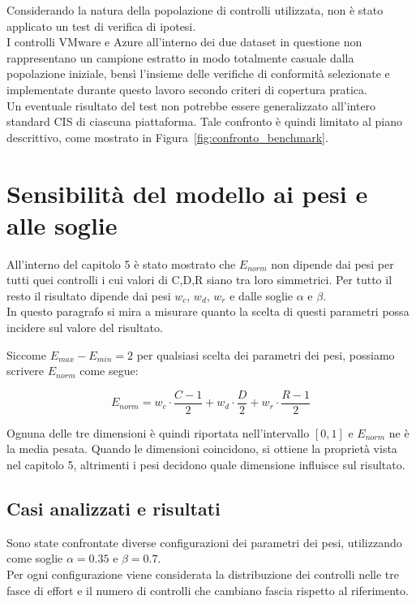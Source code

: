 \documentclass[a4paper,11pt]{report}
\begin{document}
Considerando la natura della popolazione di controlli utilizzata, non è stato applicato un test di verifica di ipotesi.\\
I controlli VMware e Azure all'interno dei due dataset in questione non rappresentano un campione estratto in modo totalmente casuale dalla popolazione iniziale, bensì l'insieme delle verifiche di conformità selezionate e implementate durante questo lavoro secondo criteri di copertura pratica. \\
Un eventuale risultato del test non potrebbe essere generalizzato all'intero standard CIS di ciascuna piattaforma. Tale confronto è quindi limitato al piano descrittivo, come mostrato in Figura~\ref{fig:confronto_benchmark}.


\section{Sensibilità del modello ai pesi e alle soglie}

All'interno del capitolo 5 è stato mostrato che $E_{norm}$ non dipende dai pesi per tutti quei controlli i cui valori di C,D,R siano tra loro simmetrici. Per tutto il resto il risultato dipende dai pesi $w_c$, $w_d$, $w_r$ e dalle soglie $\alpha$ e $\beta$.\\
In questo paragrafo si mira a misurare quanto la scelta di questi parametri possa incidere sul valore del risultato.

Siccome $E_{max}-E_{min}=2$ per qualsiasi scelta dei parametri dei pesi, possiamo scrivere  $E_{norm}$ come segue:

\begin{equation}
E_{norm} = w_c \cdot \frac{C-1}{2} + w_d \cdot \frac{D}{2} + w_r \cdot \frac{R-1}{2}
\end{equation}

Ognuna delle tre dimensioni è quindi riportata nell'intervallo $[0,1]$ e $E_{norm}$ ne è la media pesata. Quando le dimensioni coincidono, si ottiene la proprietà vista nel capitolo 5, altrimenti i pesi decidono quale dimensione influisce sul risultato.\\

\subsection{Casi analizzati e risultati}

Sono state confrontate diverse configurazioni dei parametri dei pesi, utilizzando come soglie $\alpha=0.35$ e $\beta=0.7$.\\
Per ogni configurazione viene considerata la distribuzione dei controlli nelle tre fasce di effort e il numero di controlli che cambiano fascia rispetto al riferimento.\\
\end{document}
